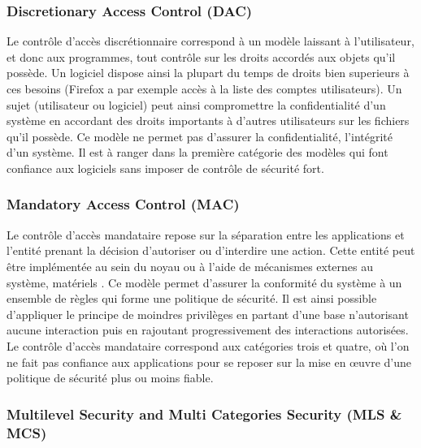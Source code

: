 \documentclass[pdftex,a4paper,titlepage,11pt]{article}
\begin{document}
\subsubsection{Discretionary Access Control (DAC)}

Le contrôle d'accès discrétionnaire correspond à un modèle laissant à l'utilisateur, et donc aux programmes, tout contrôle sur les droits accordés aux objets qu'il possède. Un logiciel dispose ainsi la plupart du temps de droits bien superieurs à ces besoins (Firefox a par exemple accès à la liste des comptes utilisateurs). Un sujet (utilisateur ou logiciel) peut ainsi compromettre la confidentialité d'un système en accordant des droits importants à d'autres utilisateurs sur les fichiers qu'il possède. Ce modèle ne permet pas d'assurer la confidentialité, l'intégrité d'un système. Il est à ranger dans la première catégorie des modèles qui font confiance aux logiciels sans imposer de contrôle de sécurité fort.

\subsubsection{Mandatory Access Control (MAC)}

Le contrôle d'accès mandataire repose sur la séparation entre les applications et l'entité prenant la décision d'autoriser ou d'interdire une action. Cette entité peut être implémentée au sein du noyau ou à l'aide de mécanismes externes au système, matériels \cite{ITXT}. Ce modèle permet d'assurer la conformité du système à un ensemble de règles qui forme une politique de sécurité. Il est ainsi possible d'appliquer le principe de moindres privilèges en partant d'une base n'autorisant aucune interaction puis en rajoutant progressivement des interactions autorisées. Le contrôle d'accès mandataire correspond aux catégories trois et quatre, où l'on ne fait pas confiance aux applications pour se reposer sur la mise en \oe{}uvre d'une politique de sécurité plus ou moins fiable.


\subsubsection{Multilevel Security and Multi Categories Security (MLS \& MCS)}
\end{document}

